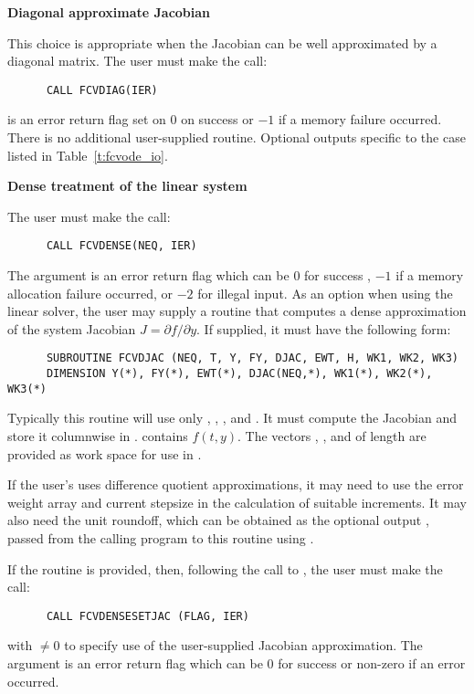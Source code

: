 \begin{Steps}
  {\s} {\bf Diagonal approximate Jacobian}
  
  This choice is appropriate when the Jacobian can be well approximated by
  a diagonal matrix.  The user must make the call:
\begin{verbatim}
      CALL FCVDIAG(IER)
\end{verbatim}
   is an error return flag set on $0$ on success or $-1$ if a memory 
  failure occurred.
  There is no additional user-supplied routine. Optional outputs specific
  to the {\diag} case listed in Table~\ref{t:fcvode_io}.
  
  {\s} {\bf Dense treatment of the linear system}
  
  The user must make the call:
\begin{verbatim}
      CALL FCVDENSE(NEQ, IER)
\end{verbatim}
  The argument  is an error return flag which can be $0$ 
  for success , $-1$ if a memory allocation failure occurred, or $-2$ for illegal
  input.  
  As an option when using the {\dense} linear solver, the user may supply a
  routine that computes a dense approximation of the system Jacobian 
  $J = \partial f / \partial y$. If supplied, it must have the following form:
\begin{verbatim}
      SUBROUTINE FCVDJAC (NEQ, T, Y, FY, DJAC, EWT, H, WK1, WK2, WK3)
      DIMENSION Y(*), FY(*), EWT(*), DJAC(NEQ,*), WK1(*), WK2(*), WK3(*)
\end{verbatim}
  Typically this routine will use only , , , and . 
  It must compute the Jacobian and store it columnwise in .
   contains $f(t,y)$. The vectors , , and 
  of length  are provided as work space for use in .
  
  If the user's  uses difference quotient approximations, it
  may need to use the error weight array  and current stepsize 
  in the calculation of suitable increments.  It may also need the unit
  roundoff, which can be obtained as the optional output ,
  passed from the calling program to this routine using .

  If the  routine is provided, then, 
  following the call to , the user must make the call:
\begin{verbatim}
      CALL FCVDENSESETJAC (FLAG, IER)
\end{verbatim}
  with $\neq 0$ to specify use of the user-supplied Jacobian approximation.
  The argument  is an error return flag which can be $0$ 
  for success or non-zero if an error occurred.
  

\end{Steps}
